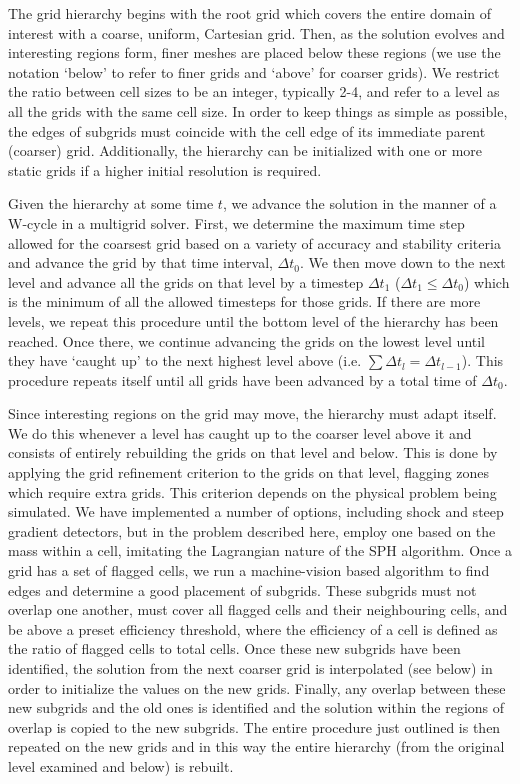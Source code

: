 The grid hierarchy begins with the root grid which covers the entire
domain of interest with a coarse, uniform, Cartesian grid. Then, as
the solution evolves and interesting regions form, finer meshes are
placed below these regions (we use the notation `below' to refer to
finer grids and `above' for coarser grids).  We restrict the ratio
between cell sizes to be an integer, typically 2-4, and refer to a
level as all the grids with the same cell size.  In order to keep
things as simple as possible, the edges of subgrids must coincide with
the cell edge of its immediate parent (coarser) grid. Additionally,
the hierarchy can be initialized with one or more static grids if a
higher initial resolution is required.

Given the hierarchy at some time $t$, we advance the solution in the
manner of a W-cycle in a multigrid solver.  First, we determine the
maximum time step allowed for the coarsest grid based on a variety of
accuracy and stability criteria and advance the grid by that time
interval, $\Delta t_0$.  We then move down to the next level and
advance all the grids on that level by a timestep $\Delta t_1$
($\Delta t_1 \leq \Delta t_0$) which is the minimum of all the allowed
timesteps for those grids.  If there are more levels, we repeat this
procedure until the bottom level of the hierarchy has been reached.
Once there, we continue advancing the grids on the lowest level until
they have `caught up' to the next highest level above (i.e. $\sum
\Delta t_l = \Delta t_{l-1}$).  This procedure repeats itself until
all grids have been advanced by a total time of $\Delta t_0$.

Since interesting regions on the grid may move, the hierarchy must
adapt itself.  We do this whenever a level has caught up to the
coarser level above it and consists of entirely rebuilding the grids
on that level and below.  This is done by applying the grid refinement
criterion to the grids on that level, flagging zones which require
extra grids.  This criterion depends on the physical problem being
simulated.  We have implemented a number of options, including shock
and steep gradient detectors, but in the problem described here,
employ one based on the mass within a cell, imitating the Lagrangian
nature of the SPH algorithm.  Once a grid has a set of flagged cells,
we run a machine-vision based algorithm \citep{Berger91} to find edges
and determine a good placement of subgrids.  These subgrids must not
overlap one another, must cover all flagged cells and their
neighbouring cells, and be above a preset efficiency threshold, where
the efficiency of a cell is defined as the ratio of flagged cells to
total cells.  Once these new subgrids have been identified, the
solution from the next coarser grid is interpolated (see below) in
order to initialize the values on the new grids.  Finally, any overlap
between these new subgrids and the old ones is identified and the
solution within the regions of overlap is copied to the new subgrids.
The entire procedure just outlined is then repeated on the new grids
and in this way the entire hierarchy (from the original level examined
and below) is rebuilt.

